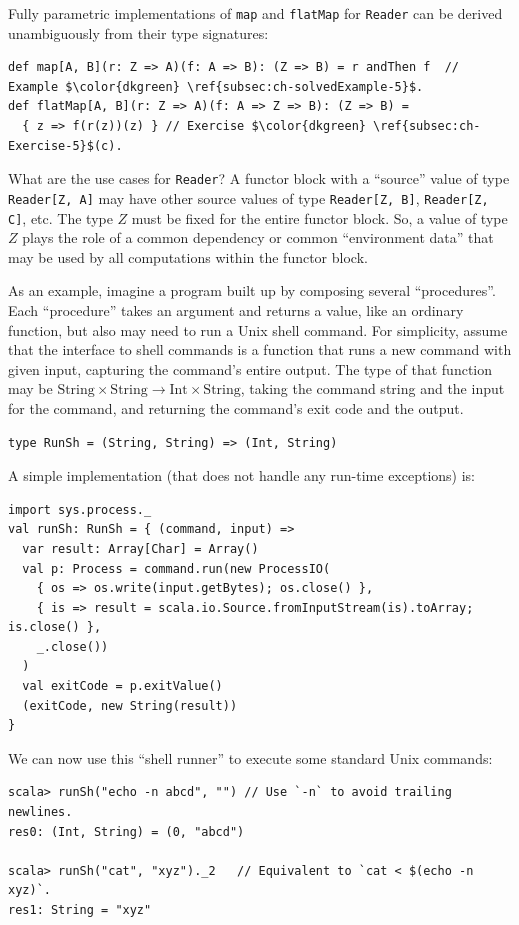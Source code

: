 Fully parametric implementations of \lstinline!map! and \lstinline!flatMap!
for \lstinline!Reader! can be derived unambiguously from their type
signatures:
\begin{lstlisting}[mathescape=true]
def map[A, B](r: Z => A)(f: A => B): (Z => B) = r andThen f  // Example $\color{dkgreen} \ref{subsec:ch-solvedExample-5}$.
def flatMap[A, B](r: Z => A)(f: A => Z => B): (Z => B) =
  { z => f(r(z))(z) } // Exercise $\color{dkgreen} \ref{subsec:ch-Exercise-5}$(c).
\end{lstlisting}

What are the use cases for \lstinline!Reader!? A functor block with
a \textsf{``}source\textsf{''} value of type \lstinline!Reader[Z, A]! may have other
source values of type \lstinline!Reader[Z, B]!, \lstinline!Reader[Z, C]!,
etc. The type $Z$ must be fixed for the entire functor block. So,
a value of type $Z$ plays the role of a common dependency or common
\textsf{``}environment data\textsf{''} that may be used by all computations within
the functor block.

As an example, imagine a program built up by composing several \textsf{``}procedures\textsf{''}.
Each \textsf{``}procedure\textsf{''} takes an argument and returns a value, like an
ordinary function, but also may need to run a Unix shell command.
For simplicity, assume that the interface to shell commands is a function
that runs a new command with given input, capturing the command\textsf{'}s
entire output. The type of that function may be $\text{String}\times\text{String}\rightarrow\text{Int}\times\text{String}$,
taking the command string and the input for the command, and returning
the command\textsf{'}s exit code and the output.
\begin{lstlisting}
type RunSh = (String, String) => (Int, String)
\end{lstlisting}
A simple implementation (that does not handle any run-time exceptions)
is:
\begin{lstlisting}
import sys.process._
val runSh: RunSh = { (command, input) =>
  var result: Array[Char] = Array()
  val p: Process = command.run(new ProcessIO(
    { os => os.write(input.getBytes); os.close() },
    { is => result = scala.io.Source.fromInputStream(is).toArray; is.close() },
    _.close())
  )
  val exitCode = p.exitValue()
  (exitCode, new String(result))
}
\end{lstlisting}
We can now use this \textsf{``}shell runner\textsf{''} to execute some standard Unix
commands:
\begin{lstlisting}
scala> runSh("echo -n abcd", "") // Use `-n` to avoid trailing newlines.
res0: (Int, String) = (0, "abcd")

scala> runSh("cat", "xyz")._2   // Equivalent to `cat < $(echo -n xyz)`.
res1: String = "xyz"
\end{lstlisting}

